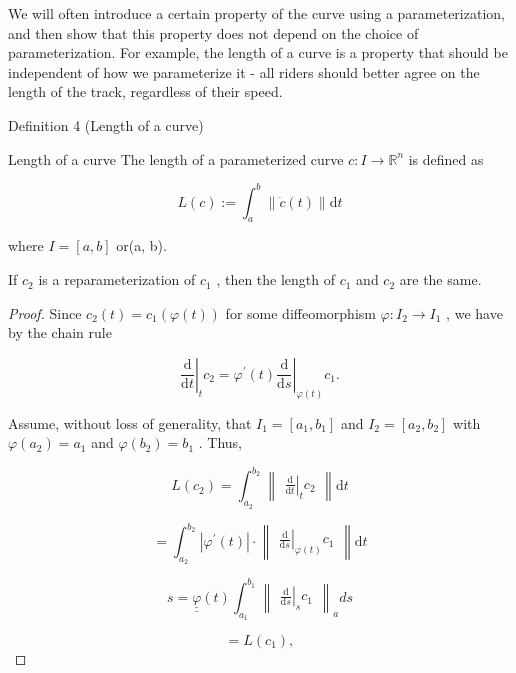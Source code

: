 We will often introduce a certain property of the curve using a parameterization, and then show that this property does not depend on the choice of parameterization. For example, the length of a curve is a property that should be independent of how we parameterize it - all riders should better agree on the length of the track, regardless of their speed.



Definition 4 (Length of a curve)

\begin{definition}{Length of a curve}
    The length of a parameterized curve \(c : I \rightarrow  {\mathbb{R}}^{n}\) is defined as

\[
L\left( c\right)  \mathrel{\text{ := }} {\int }_{a}^{b}\parallel \dot{c}\left( t\right) \parallel \mathrm{d}t \tag{1.1}
\]

where \(I = \left\lbrack  {a,b}\right\rbrack\) or(a, b).
\end{definition}

\begin{lemma}{}
    If \({c}_{2}\) is a reparameterization of \({c}_{1}\) , then the length of \({c}_{1}\) and \({c}_{2}\) are the same.
\end{lemma}

\begin{proof}
Since \({c}_{2}\left( t\right)  = {c}_{1}\left( {\varphi \left( t\right) }\right)\) for some diffeomorphism \(\varphi  : {I}_{2} \rightarrow  {I}_{1}\) , we have by the chain rule

\[
{\left. \frac{\mathrm{d}}{\mathrm{d}t}\right| }_{t}{c}_{2} = {\left. {\varphi }^{\prime }\left( t\right) \frac{\mathrm{d}}{\mathrm{d}s}\right| }_{\varphi \left( t\right) }{c}_{1}.
\]

Assume, without loss of generality, that \({I}_{1} = \left\lbrack  {{a}_{1},{b}_{1}}\right\rbrack\) and \({I}_{2} = \left\lbrack  {{a}_{2},{b}_{2}}\right\rbrack\) with \(\varphi \left( {a}_{2}\right)  = {a}_{1}\) and \(\varphi \left( {b}_{2}\right)  = {b}_{1}\) . Thus,

\[
L\left( {c}_{2}\right)  = {\int }_{{a}_{2}}^{{b}_{2}}\begin{Vmatrix}{{\left. \frac{\mathrm{d}}{\mathrm{d}t}\right| }_{t}{c}_{2}}\end{Vmatrix}\mathrm{d}t
\]

\[
= {\int }_{{a}_{2}}^{{b}_{2}}\left| {{\varphi }^{\prime }\left( t\right) }\right|  \cdot  \begin{Vmatrix}{{\left. \frac{\mathrm{d}}{\mathrm{d}s}\right| }_{\varphi \left( t\right) }{c}_{1}}\end{Vmatrix}\mathrm{d}t
\]

\[
s = \underline{\underline{\varphi }}\left( t\right) {\int }_{{a}_{1}}^{{b}_{1}}{\begin{Vmatrix}{\left. \frac{\mathrm{d}}{\mathrm{d}s}\right| }_{s}{c}_{1}\end{Vmatrix}}_{a}{ds}
\]

\[
= L\left( {c}_{1}\right) ,
\]
\end{proof}


